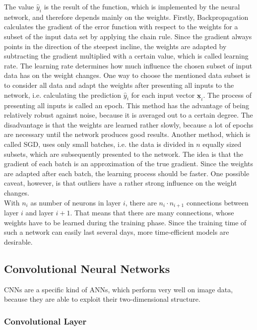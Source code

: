 \documentclass[11pt, a4paper]{article}
\newcommand\V[1]{\ensuremath{\underline{\mathbf{#1}}}}
\begin{document}
The value $\hat{y}_i$ is the result of the function, which is implemented by the neural network, and therefore depends mainly on the weights. Firstly, Backpropagation calculates the gradient of the error function with respect to the weights for a subset of the input data set by applying the chain rule. Since the gradient always points in the direction of the steepest incline, the weights are adapted by subtracting the gradient multiplied with a certain value, which is called learning rate. The learning rate determines how much influence the chosen subset of input data has on the weight changes. One way to choose the mentioned data subset is to consider all data and adapt the weights after presenting all inputs to the network, i.e. calculating the prediction $\hat{y}_i$ for each input vector $\V{x}_i$. The process of presenting all inputs is called an epoch. This method has the advantage of being relatively robust against noise, because it is averaged out to a certain degree. The disadvantage is that the weights are learned rather slowly, because a lot of epochs are necessary until the network produces good results. Another method, which is called \acf{SGD}, uses only small batches, i.e. the data is divided in $n$ equally sized subsets, which are subsequently presented to the network. The idea is that the gradient of each batch is an approximation of the true gradient. Since the weights are adapted after each batch, the learning process should be faster. One possible caveat, however, is that outliers have a rather strong influence on the weight changes.\\
With $n_i$ as number of neurons in layer $i$, there are $n_i \cdot n_{i+1}$ connections between layer $i$ and layer $i+1$. That means that there are many connections, whose weights have to be learned during the training phase. Since the training time of such a network can easily last several days, more time-efficient models are desirable.

\subsection{Convolutional Neural Networks}

\acfp{CNN} are a specific kind of \acp{ANN}, which perform very well on image data, because they are able to exploit their two-dimensional structure.

\subsubsection{Convolutional Layer}
\label{subsubsec:convolutionallayer}
\end{document}
